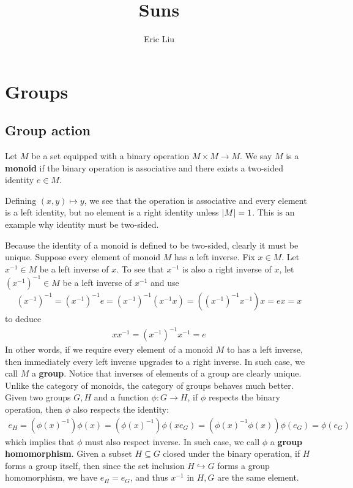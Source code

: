 \documentclass{report}
\title{Suns}
\author{Eric Liu}
\date{}
\begin{document}
\maketitle
\newpage %

\tableofcontents
\pagebreak
\chapter{Groups}

\section{Group action}
Let $M$ be a set equipped with a binary operation $M\times M \rightarrow M$. We say $M$ is a \textbf{monoid} if the binary operation is associative and there exists a two-sided identity $e \in M$. 
\begin{example}
Defining $(x,y)\mapsto y$, we see that the operation is associative and every element is a left identity, but no element is a right identity unless $\left|M\right|=1$. This is an example why identity must be two-sided. 
\end{example}
Because the identity of a monoid is defined to be two-sided, clearly it must be unique.  Suppose every element of monoid $M$ has a left inverse. Fix $x \in M$. Let $x^{-1}\in M$ be a left inverse of $x$. To see that  $x^{-1}$ is also a right inverse of $x$, let  $(x^{-1})^{-1}\in M$ be a left inverse of $x^{-1}$ and use  
\begin{align*}
  (x^{-1})^{-1}=(x^{-1})^{-1}e=(x^{-1})^{-1}(x^{-1}x)= ((x^{-1})^{-1}x^{-1})x= ex=x
\end{align*}
to deduce
\begin{align*}
xx^{-1}=(x^{-1})^{-1}x^{-1}= e
\end{align*}
In other words, if we require every element of a monoid $M$ to has a left inverse, then immediately every left inverse upgrades to a right inverse. In such case, we call $M$ a  \textbf{group}. Notice that inverses of elements of a group are clearly unique. \\


Unlike the category of monoids, the category of groups behaves much better. Given two groups $G,H$ and a function  $\phi : G\rightarrow H$, if $\phi$ respects the binary operation, then $\phi$ also respects the identity:
\begin{align*}
e_H = (\phi (x)^{-1})\phi (x) = (\phi(x)^{-1}) \phi(x e_G) =  (\phi (x)^{-1} \phi (x)) \phi (e_G)=\phi (e_G)
\end{align*}
which implies that $\phi$ must also respect inverse. In such case, we call $\phi$ a \textbf{group homomorphism}. Given a subset $H \subseteq G$ closed under the binary operation, if $H$ forms a group itself, then since the set inclusion $H \hookrightarrow G$ forms a group homomorphism, we have $e_H=e_G$, and thus $x^{-1}$ in $H,G$ are the same element. \\
 
\end{document}
